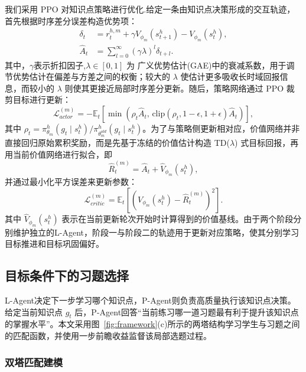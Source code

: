\documentclass[11pt,a4paper]{article}
\begin{document}
我们采用 PPO 对知识点策略进行优化.给定一条由知识点决策形成的交互轨迹，首先根据时序差分误差构造优势项：
\begin{equation}
\begin{aligned}
\delta_t &= r_t^{h,m}+\gamma V_{\phi_m}(s_{t+1}^h)-V_{\phi_m}(s_t^h),\\
\hat{A}_t &= \sum_{l=0}^{\infty}(\gamma\lambda)^l\delta_{t+l}.
\end{aligned}
\end{equation}
其中，$\gamma$表示折扣因子,$\lambda\in[0,1]$ 为 广义优势估计(GAE)中的衰减系数，用于调节优势估计在偏差与方差之间的权衡；较大的 $\lambda$ 使估计更多吸收长时域回报信息，而较小的 $\lambda$ 则使其更接近局部时序差分更新。随后，策略网络通过 PPO 裁剪目标进行更新：
\begin{equation}
\mathcal{L}_{actor}^{(m)}
=
-\mathbb{E}_t
\left[
\min\left(
\rho_t\hat{A}_t,\,
\mathrm{clip}(\rho_t,1-\epsilon,1+\epsilon)\hat{A}_t
\right)
\right],
\end{equation}
其中 $\rho_t=\pi_{\theta_m}^h(g_t\mid s_t^h)/\pi_{\theta_m^{old}}^h(g_t\mid s_t^h)$。为了与策略侧更新相对应，价值网络并非直接回归原始累积奖励，而是先基于冻结的价值估计构造 TD($\lambda$) 式目标回报，再用当前价值网络进行拟合，即
\begin{equation}
\hat{R}_t^{(m)}=\hat{A}_t+\hat{V}_{\phi_m}(s_t^h),
\end{equation}
并通过最小化平方误差来更新参数：
\begin{equation}
\mathcal{L}_{critic}^{(m)}
=
\mathbb{E}_t\left[
\left(
V_{\phi_m}(s_t^h)-\hat{R}_t^{(m)}
\right)^2
\right].
\end{equation}
其中 $\hat{V}_{\phi_m}(s_t^h)$ 表示在当前更新轮次开始时计算得到的价值基线。由于两个阶段分别维护独立的L-Agent，阶段一与阶段二的轨迹用于更新对应策略，使其分别学习目标推进和目标巩固偏好。

\subsection{目标条件下的习题选择}
L-Agent决定下一步学习哪个知识点，P-Agent则负责高质量执行该知识点决策。给定当前知识点 $g_t$ 后，P-Agent回答“当前练习哪一道习题最有利于提升该知识点的掌握水平”。本文采用图~\ref{fig:framework}(c)所示的两塔结构学习学生与习题之间的匹配函数，并使用一步前瞻收益监督该局部选题过程。

\subsubsection{双塔匹配建模}
\end{document}
